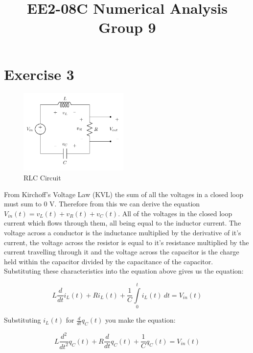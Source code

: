 \documentclass[11pt,a4paper]{article}
\date{}
\author{}
\begin{document}
\title{\textbf{EE2-08C Numerical Analysis} \\ Group 9\vspace{-17mm}}
\maketitle


\section*{Exercise 3}\vspace{-1mm}

\begin{figure}
	\begin{center}	
  		\includegraphics[width=0.48\textwidth]{Ex3_Figs/RLC.png}
	\end{center}  	
  	\caption{RLC Circuit}
  	\label{fig:boat1}
\end{figure}
From Kirchoff's Voltage Law (KVL) the sum of all the voltages in a closed loop must sum to 0 V. Therefore from this we can derive the equation $V_{in}(t) = v_L(t)+v_R(t)+v_C(t)$. All of the voltages in the closed loop current which flows through them, all being equal to the inductor current. The voltage across a conductor is the inductance multiplied by the derivative of it's current, the voltage across the resistor is equal to it's resistance multiplied by the current travelling through it and the voltage across the capacitor is the charge held within the capacitor divided by the capacitance of the capacitor. Substituting these characteristics into the equation above gives us the equation:

\[ L \frac{d}{dt}i_L(t) + R i_L(t) + \frac{1}{C}\int\limits_0^t i_L(t) \ dt = V_{in}(t)\] 

Substituting $i_L(t)$ for $\frac{d}{dt}q_C(t)$ you make the equation:

\[ L \frac{d^2}{dt^2}q_C(t) + R\frac{d}{dt}q_C(t) + \frac{1}{C}q_C(t) = V_{in}(t)\]
\end{document}

